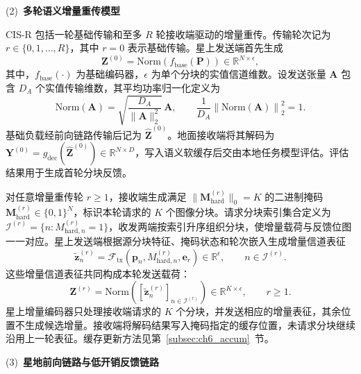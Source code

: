 \noindent(2)~\textbf{多轮语义增量重传模型}

CIS-R 包括一轮基础传输和至多 $R$ 轮接收端驱动的增量重传。传输轮次记为 $r\in\{0,1,\dots,R\}$，其中 $r=0$ 表示基础传输。星上发送端首先生成
\begin{equation}\label{eq:ch6_base}
\mathbf Z^{(0)}=\mathrm{Norm}\!\left(f_{\mathrm{base}}(\mathbf P)\right)
\in\mathbb R^{N\times\epsilon},
\end{equation}
其中，$f_{\mathrm{base}}(\cdot)$ 为基础编码器，$\epsilon$ 为单个分块的实值信道维数。设发送张量 $\mathbf A$ 包含 $D_A$ 个实值传输维数，其平均功率归一化定义为
\begin{equation}\label{eq:ch6_norm}
\mathrm{Norm}(\mathbf A)=\sqrt{\frac{D_A}{\lVert\mathbf A\rVert_2^2}}\,\mathbf A,
\qquad
\frac{1}{D_A}\left\lVert\mathrm{Norm}(\mathbf A)\right\rVert_2^2=1.
\end{equation}
基础负载经前向链路传输后记为 $\hat{\mathbf Z}^{(0)}$。地面接收端将其解码为 $\mathbf Y^{(0)}=g_{\mathrm{dec}}(\hat{\mathbf Z}^{(0)})\in\mathbb R^{N\times D}$，写入语义软缓存后交由本地任务模型评估。评估结果用于生成首轮分块反馈。

对任意增量重传轮 $r\geq1$，接收端生成满足 $\lVert\mathbf M_{\mathrm{hard}}^{(r)}\rVert_0=K$ 的二进制掩码 $\mathbf M_{\mathrm{hard}}^{(r)}\in\{0,1\}^{N}$，标识本轮请求的 $K$ 个图像分块。请求分块索引集合定义为 $\mathcal I^{(r)}=\{n:M_{\mathrm{hard},n}^{(r)}=1\}$，收发两端按索引升序组织分块，使增量载荷与反馈位图一一对应。星上发送端根据源分块特征、掩码状态和轮次嵌入生成增量信道表征
\begin{equation}
\tilde{\mathbf z}_{n}^{(r)}
=\mathcal F_{\mathrm{tx}}\!\left(
\mathbf p_n,M_{\mathrm{hard},n}^{(r)},\mathbf e_r
\right)
\in\mathbb R^{\epsilon},
\qquad n\in\mathcal I^{(r)}.
\end{equation}
这些增量信道表征共同构成本轮发送载荷：
\begin{equation}\label{eq:ch6_maskinc}
\mathbf Z^{(r)}
=\mathrm{Norm}\!\left(
\left[\tilde{\mathbf z}_{n}^{(r)}\right]_{n\in\mathcal I^{(r)}}
\right)
\in\mathbb R^{K\times\epsilon},\qquad r\geq1.
\end{equation}
星上增量编码器只处理接收端请求的 $K$ 个分块，并发送相应的增量表征，其余位置不生成候选增量。接收端将解码结果写入掩码指定的缓存位置，未请求分块继续沿用上一轮表征。缓存更新方法见第~\ref{subsec:ch6_accum}~节。

\noindent(3)~\textbf{星地前向链路与低开销反馈链路}

